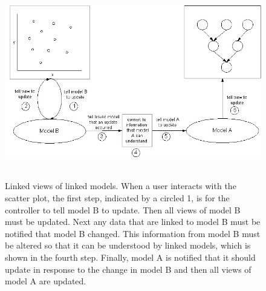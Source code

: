 \documentclass[11pt]{article}
\newcommand{\Robject}[1]{{\texttt{#1}}}
\begin{document}
\begin{figure}[ht]
  \begin{center}
    \includegraphics[height=3.3in, width=6in]{firstMessagePassing.jpg}
    \caption{ Linked views of linked models.  When a user interacts with
      the scatter plot, the first step, indicated by a circled 1,
      is for the controller to tell model B to update.  Then all views of
      model B must be updated.  Next any data that are linked to model B must
      be notified that model B changed.  This information from model B must be
      altered so that it can be understood by linked models, which is shown
      in the fourth step.  Finally, model A is notified that it should
      update in response to the change in model B and then all views of
      model A are updated. }
    \label{Fig:firstMP}
  \end{center}
\end{figure}

\end{document}
